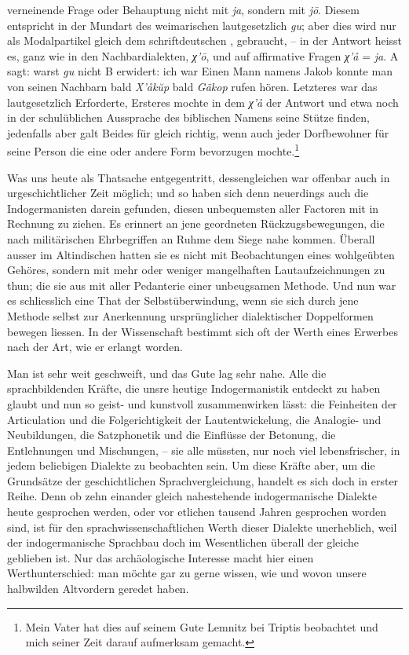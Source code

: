 {verneinende Frage oder Behauptung nicht mit \textit{ja}, sondern mit \textit{jō}. Diesem entspricht in der Mundart des weimarischen  lautgesetzlich \textit{gu}; aber dies wird nur als Modalpartikel gleich dem schriftdeutschen ,  gebraucht, – in der Antwort heisst es, ganz wie in den Nachbardialekten, \textit{χ’ō}, und auf affirmative Fragen \textit{χ’å} = \textit{ja}. A sagt:  warst \textit{gu} nicht  B erwidert:  ich war  Einen Mann namens Jakob konnte man von seinen Nachbarn bald \textit{X’åkŭp} bald \textit{Gäkop} rufen hören. Letzteres war das lautgesetzlich Erforderte, Ersteres mochte in dem \textit{χ’å} der Antwort und etwa noch in der schulüblichen Aussprache des biblischen Namens seine Stütze finden, jedenfalls aber galt Beides für gleich richtig, wenn auch jeder Dorfbewohner für seine Person die eine oder andere Form bevorzugen mochte.\footnote{Mein Vater hat dies auf seinem Gute Lemnitz bei Triptis beobachtet und mich seiner Zeit darauf aufmerksam gemacht.}

Was uns heute als Thatsache entgegentritt, dessengleichen war offenbar auch in urgeschichtlicher Zeit möglich; und so haben sich denn neuerdings auch die Indogermanisten darein gefunden, diesen unbequemsten aller Factoren mit in Rechnung zu ziehen. Es erinnert an jene geordneten Rückzugsbewegungen, die nach militärischen Ehrbegriffen an Ruhme dem Siege nahe kommen. Überall ausser im Altindischen hatten sie es nicht mit Beobachtungen eines wohlgeübten Gehöres, sondern mit mehr oder weniger mangelhaften Lautaufzeichnungen zu thun; die  sie aus mit aller Pedanterie einer unbeugsamen Methode. Und nun war es schliesslich eine That der Selbstüberwindung, wenn sie sich durch jene Methode selbst zur Anerkennung ursprünglicher dialektischer Doppelformen bewegen liessen. In der Wissenschaft bestimmt sich oft der Werth eines Erwerbes nach der Art, wie er erlangt worden.

Man ist sehr weit geschweift, und das Gute lag sehr nahe. Alle die sprachbildenden Kräfte, die unsre heutige Indogermanistik entdeckt zu haben \label{sp.286} glaubt und nun so geist- und kunstvoll zusammenwirken lässt: die Feinheiten der Articulation und die Folgerichtigkeit der Lautentwickelung, die Analogie- und Neubildungen, die Satzphonetik und die Einflüsse der Betonung, die Entlehnungen und Mischungen, – sie alle \label{fp.280} müssten, nur noch viel lebensfrischer, in jedem beliebigen Dialekte zu beobachten sein. Um diese Kräfte aber, um die Grundsätze der geschichtlichen Sprachvergleichung, handelt es sich doch in erster Reihe. Denn ob zehn einander gleich nahestehende indogermanische Dialekte heute gesprochen werden, oder vor etlichen tausend Jahren gesprochen worden sind, ist für den sprachwissenschaftlichen Werth dieser Dialekte unerheblich, weil der indogermanische Sprachbau doch im Wesentlichen überall der gleiche geblieben ist. Nur das archäologische Interesse macht hier einen Werthunterschied: man möchte gar zu gerne wissen, wie und wovon unsere halbwilden Altvordern geredet haben.

}
